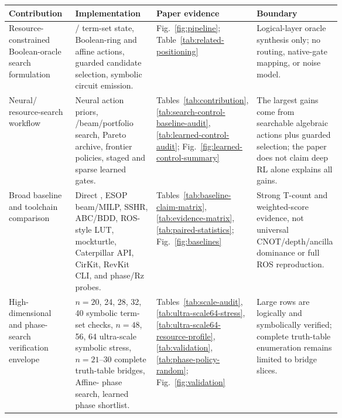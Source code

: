 \begin{tabularx}{\linewidth}{>{\raggedright\arraybackslash}p{0.20\linewidth}>{\raggedright\arraybackslash}X>{\raggedright\arraybackslash}p{0.22\linewidth}>{\raggedright\arraybackslash}p{0.24\linewidth}}
\toprule
Contribution & Implementation & Paper evidence & Boundary \\
\midrule
Resource-constrained Boolean-oracle search formulation & \anf{}/\fprm{} term-set state, Boolean-ring and affine actions, guarded candidate selection, symbolic circuit emission. & Fig.~\ref{fig:pipeline}; Table~\ref{tab:related-positioning} & Logical-layer oracle synthesis only; no routing, native-gate mapping, or noise model. \\
Neural/\mcts{} resource-search workflow & Neural action priors, \mcts{}/beam/portfolio search, Pareto archive, frontier policies, staged and sparse learned gates. & Tables~\ref{tab:contribution}, \ref{tab:search-control-baseline-audit}, \ref{tab:learned-control-audit}; Fig.~\ref{fig:learned-control-summary} & The largest gains come from searchable algebraic actions plus guarded selection; the paper does not claim deep RL alone explains all gains. \\
Broad baseline and toolchain comparison & Direct \anf{}, ESOP beam/MILP, SSHR, ABC/BDD, ROS-style LUT, mockturtle, Caterpillar API, CirKit, RevKit CLI, and phase/Rz probes. & Tables~\ref{tab:baseline-claim-matrix}, \ref{tab:evidence-matrix}, \ref{tab:paired-statistics}; Fig.~\ref{fig:baselines} & Strong T-count and weighted-score evidence, not universal CNOT/depth/ancilla dominance or full ROS reproduction. \\
High-dimensional and phase-search verification envelope & $n=20$, 24, 28, 32, 40 symbolic term-set checks, $n=48$, 56, 64 ultra-scale symbolic stress, $n=21$--$30$ complete truth-table bridges, Affine-\fprm{} phase search, learned phase shortlist. & Tables~\ref{tab:scale-audit}, \ref{tab:ultra-scale64-stress}, \ref{tab:ultra-scale64-resource-profile}, \ref{tab:validation}, \ref{tab:phase-policy-random}; Fig.~\ref{fig:validation} & Large rows are logically and symbolically verified; complete truth-table enumeration remains limited to bridge slices. \\
\bottomrule
\end{tabularx}
